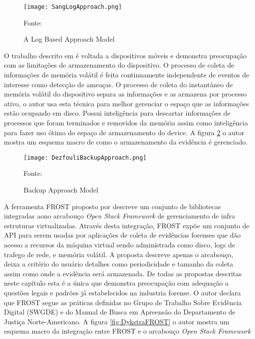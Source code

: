 \begin{figure}[htb!]
\footnotesize
\caption{A Log Based Approach Model}
\texttt{[image: SangLogApproach.png]}
\centering
\label{fig:SangLogApproach}
\begin{center}
Fonte: \cite{SangLogApproach:2013} 
\end{center}
\end{figure}

O trabalho descrito em \cite{DezfouliBackupApproach:2012} é voltada a dispositivos móveis e demonstra preocupação com as limitações de armazenamento do dispositivo.
%
O processo de coleta de informações de memória volátil é feita continuamente independente de eventos de interesse como detecção de ameaças.
%
O processo de coleta do instantâneo de memória volátil do dispositivo separa as informações e as armazena por processo ativo, o autor usa esta técnica para melhor gerenciar o espaço que as informações estão ocupando em disco. 
%
Possui inteligência para descartar informações de processos que foram terminados e removidos da memória assim como inteligência para fazer uso ótimo do espaço de armazenamento do device.
%
A figura \ref{fig:DezfouliBackupApproach} o autor mostra um esquema macro de como o armazenamento da evidência é gerenciado.

\begin{figure}[htb!]
\footnotesize
\caption{Backup Approach Model}
\texttt{[image: DezfouliBackupApproach.png]}
\centering
\label{fig:DezfouliBackupApproach}
\begin{center}
Fonte: \cite{DezfouliBackupApproach:2012} 
\end{center}
\end{figure}

A ferramenta FROST proposto por \cite{DykstraFROST:2013} descreve um conjunto de bibliotecas integradas aono arcabouço \textit{Open Stack Framework} de gerenciamento de infra estruturas virtualizadas.
%
Através desta integração, FROST expõe um conjunto de API para serem usadas por aplicações de coleta de evidências forenses que dão acesso a recursos da máquina virtual sendo administrada como disco, logs de trafego de rede, e memória volátil.
%
A proposta descreve apenas o arcabouço, deixa a critério do usuário detalhes como periodicidade e tamanho da coleta assim como onde a evidência será armazenada.
%
De todas as propostas descritas neste capítulo esta é a única que demonstra preocupação com adequação a questões legais e padrões já estabelecidos na industria forense.
%
O autor declara que FROST segue as práticas definidas no Grupo de Trabalho Sobre Evidência Digital (SWGDE) e do Manual de Busca em Apreensão do Departamento de Justiça Norte-Americano.
%
A figura \ref{fig:DykstraFROST} o autor mostra um esquema macro da integração entre FROST e o arcabouço \textit{Open Stack Framework}


